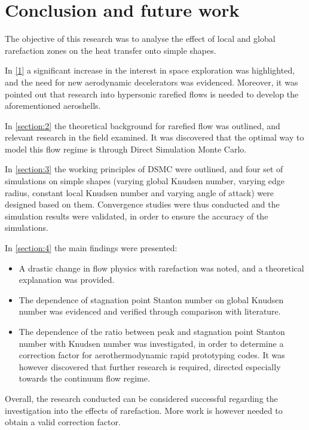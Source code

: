 \section{Conclusion and future work}
The objective of this research was to analyse the effect of local and global rarefaction zones on the heat transfer onto simple shapes. 

In \autoref{1} a significant increase in the interest in space exploration was highlighted, and the need for new aerodynamic decelerators was evidenced. Moreover, it was pointed out that research into hypersonic rarefied flows is needed to develop the aforementioned aeroshells. 

In \autoref{section:2} the theoretical background for rarefied flow was outlined, and relevant research in the field examined. It was discovered that the optimal way to model this flow regime is through Direct Simulation Monte Carlo.

In \autoref{section:3} the working principles of DSMC were outlined, and four set of simulations on simple shapes (varying global Knudsen number, varying edge radius, constant local Knudsen number and varying angle of attack) were designed based on them. Convergence studies were thus conducted and the simulation results were validated, in order to ensure the accuracy of the simulations.

In \autoref{section:4} the main findings were presented: 
\begin{itemize}
    \item A drastic change in flow physics with rarefaction was noted, and a theoretical explanation was provided.
    \item The dependence of stagnation point Stanton number on global Knudsen number was evidenced and verified through comparison with literature.
    \item The dependence of the ratio between peak and stagnation point Stanton number with Knudsen number was investigated, in order to determine a correction factor for aerothermodynamic rapid prototyping codes. It was however discovered that further research is required, directed especially towards the continuum flow regime.
\end{itemize}

Overall, the research conducted can be considered successful regarding the investigation into the effects of rarefaction. More work is however needed to obtain a valid correction factor.